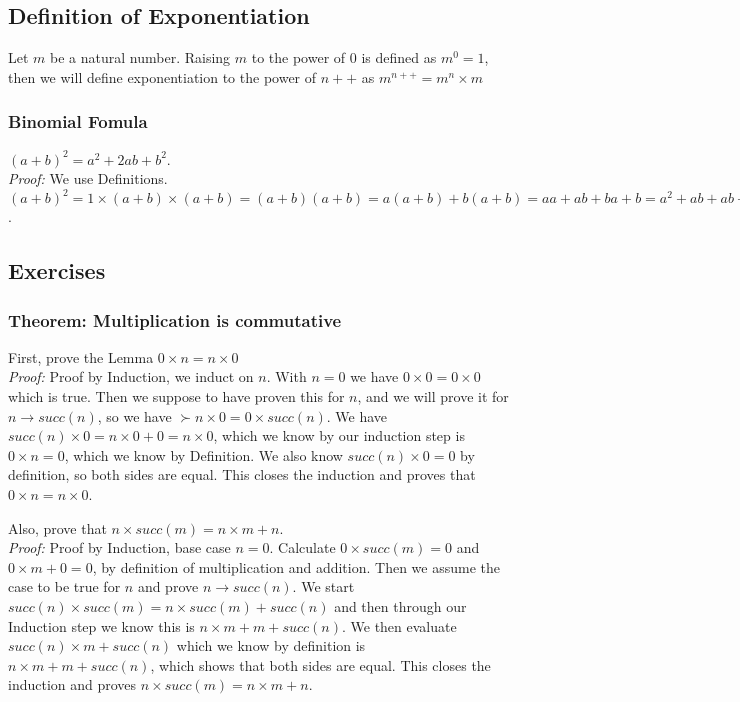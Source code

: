 \documentclass[]{scrbook}
\begin{document}
\subsection{Definition of Exponentiation}
Let $m$ be a natural number. Raising $m$ to the power of $0$ is defined as $m^0 = 1$, then we will define exponentiation to the power of $n++$ as $m^{n++} = m^n \times m$

\subsubsection*{Binomial Fomula}
$(a+b)^2 = a^2 + 2ab + b^2$.\\
\textit{Proof:} We use Definitions. $(a+b)^2 = 1\times(a+b)\times(a+b) = (a+b)(a+b) = a(a+b) + b(a+b) = aa + ab + ba + b = a^2 + ab + ab + b^2 = a^2 + 2ab + b^2$.



\subsection{Exercises}
\subsubsection*{Theorem: Multiplication is commutative}
First, prove the Lemma $0 \times n = n \times 0$\\
\textit{Proof:} Proof by Induction, we induct on $n$. With $n = 0$ we have $0 \times 0 = 0 \times 0$ which is true. Then we suppose to have proven this for $n$, and we will prove it for $n\rightarrow succ(n)$, so we have $\succ n \times 0 = 0 \times succ(n)$. We have $succ(n)\times 0 = n\times 0 + 0 = n\times0$, which we know by our induction step is $0\times n = 0$, which we know by Definition. We also know $succ(n) \times 0 = 0$ by definition, so both sides are equal. This closes the induction and proves that $0\times n = n\times0$.

Also, prove that $n \times succ(m) = n \times m + n$.\\
\textit{Proof:} Proof by Induction, base case $n = 0$. Calculate $0 \times succ(m) = 0$ and $0 \times m + 0 = 0$, by definition of multiplication and addition. Then we assume the case to be true for $n$ and prove $n\rightarrow succ(n)$. We start $succ(n) \times succ(m) = n \times succ(m) + succ(n)$ and then through our Induction step we know this is $n \times m + m + succ(n)$. We then evaluate $succ(n) \times m + succ(n)$ which we know by definition is $n \times m + m + succ(n)$, which shows that both sides are equal. This closes the induction and proves $n\times succ(m) = n\times m + n$.
\end{document}
